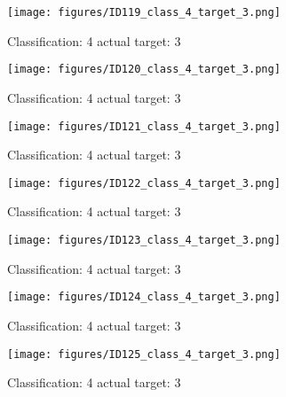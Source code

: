 \begin{figure}[h!]
\begin{center}
\texttt{[image: figures/ID119\_class\_4\_target\_3.png]}
\end{center}
\caption{ Classification: 4 actual target: 3}
\label{fig:ID119_class_4_target_3}
\end{figure}
\begin{figure}[h!]
\begin{center}
\texttt{[image: figures/ID120\_class\_4\_target\_3.png]}
\end{center}
\caption{ Classification: 4 actual target: 3}
\label{fig:ID120_class_4_target_3}
\end{figure}
\begin{figure}[h!]
\begin{center}
\texttt{[image: figures/ID121\_class\_4\_target\_3.png]}
\end{center}
\caption{ Classification: 4 actual target: 3}
\label{fig:ID121_class_4_target_3}
\end{figure}
\begin{figure}[h!]
\begin{center}
\texttt{[image: figures/ID122\_class\_4\_target\_3.png]}
\end{center}
\caption{ Classification: 4 actual target: 3}
\label{fig:ID122_class_4_target_3}
\end{figure}
\begin{figure}[h!]
\begin{center}
\texttt{[image: figures/ID123\_class\_4\_target\_3.png]}
\end{center}
\caption{ Classification: 4 actual target: 3}
\label{fig:ID123_class_4_target_3}
\end{figure}
\begin{figure}[h!]
\begin{center}
\texttt{[image: figures/ID124\_class\_4\_target\_3.png]}
\end{center}
\caption{ Classification: 4 actual target: 3}
\label{fig:ID124_class_4_target_3}
\end{figure}
\begin{figure}[h!]
\begin{center}
\texttt{[image: figures/ID125\_class\_4\_target\_3.png]}
\end{center}
\caption{ Classification: 4 actual target: 3}
\label{fig:ID125_class_4_target_3}
\end{figure}
